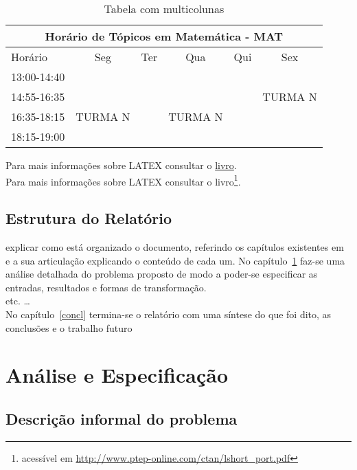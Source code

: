 \documentclass[12pt,a4paper]{report}%
\begin{document}
\begin{table}[h!] %
\begin{center}
\begin{tabular}{|l||c|c|c|c|c|}
\hline
\multicolumn{6}{|c|}{\textbf{Horário de Tópicos em Matemática - MAT}}\\
\hline
Horário    &Seg &Ter &Qua &Qui &Sex\\
\hline\hline
13:00-14:40&    &    &    &    & \\
\hline
14:55-16:35&    &    &    &    &TURMA N \\
\hline
16:35-18:15&TURMA N & &TURMA N & & \\
\hline
18:15-19:00& & & & & \\
\hline
\end{tabular}
\caption{Tabela com multicolunas}
\end{center}
\end{table}

\newpage

Para mais informações sobre LATEX consultar o
 \href{http://www.ptep-online.com/ctan/lshort_port.pdf}{livro}.\\

 Para mais informações sobre LATEX
 consultar o livro\footnote{acessível em \url{http://www.ptep-online.com/ctan/lshort_port.pdf}}.


\section*{Estrutura do Relatório}
explicar como está organizado o documento, referindo os capítulos existentes em~\cite{deransart:1990}
e a sua articulação explicando o conteúdo de cada um.
No capítulo~\ref{chap:analiseEspecificacao} faz-se uma análise detalhada do problema proposto
de modo a poder-se especificar  as entradas, resultados e formas de transformação.\\
etc. \ldots\\ %
No capítulo~\ref{concl} termina-se o relatório com uma síntese do que foi dito,
as conclusões e o trabalho futuro



\chapter{Análise e Especificação} \label{chap:analiseEspecificacao} %
\section{Descrição informal do problema} \label{sec:descricaoProblema} %
\end{document}
